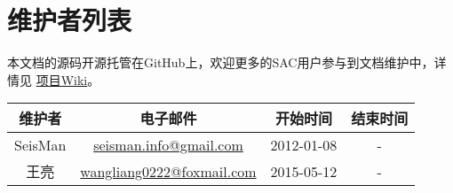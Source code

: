 {\section*{维护者列表}}

本文档的源码开源托管在GitHub上，欢迎更多的SAC用户参与到文档维护中，详情见
\href{https://github.com/seisman/SAC_Docs_zh/wiki}{项目Wiki}。

\begin{table}[H]
\centering
\begin{tabular}{cccc}
\toprule
维护者      & 电子邮件              &   开始时间    &   结束时间     \\
\midrule
SeisMan  & \url{seisman.info@gmail.com}    &  2012-01-08   &   -     \\
王亮     & \url{wangliang0222@foxmail.com} &  2015-05-12   &   -     \\
\bottomrule
\end{tabular}
\end{table}
